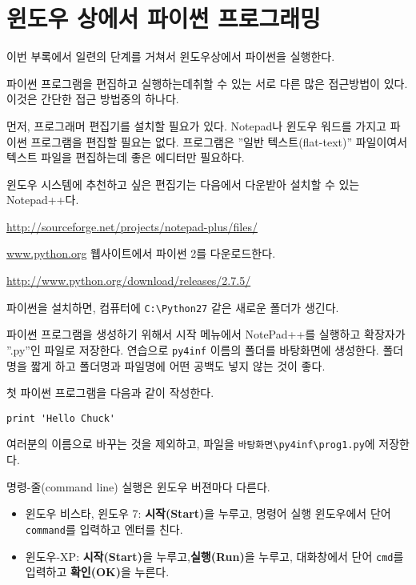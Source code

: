 
\chapter{윈도우 상에서 파이썬 프로그래밍}

이번 부록에서 일련의 단계를 거쳐서 윈도우상에서 파이썬을 실행한다.

파이썬 프로그램을 편집하고 실행하는데취할 수 있는 서로 다른 많은 접근방법이 있다. 이것은 간단한 접근 방법중의 하나다.

먼저, 프로그래머 편집기를 설치할 필요가 있다.
Notepad나 윈도우 워드를 가지고 파이썬 프로그램을 편집할 필요는 없다.
프로그램은 ''일반 텍스트(flat-text)'' 파일이여서 텍스트 파일을 편집하는데 좋은 에디터만 필요하다.

윈도우 시스템에 추천하고 싶은 편집기는 다음에서 다운받아 설치할 수 있는 Notepad++다.

\url{http://sourceforge.net/projects/notepad-plus/files/}

\url{www.python.org} 웹사이트에서 파이썬 2를 다운로드한다.

\url{http://www.python.org/download/releases/2.7.5/}

파이썬을 설치하면, 컴퓨터에 {\tt C:{\textbackslash}Python27} 같은 새로운 폴더가 생긴다.

파이썬 프로그램을 생성하기 위해서 시작 메뉴에서 NotePad++를 실행하고 확장자가 ''.py''인 파일로 저장한다.
연습으로 {\tt py4inf} 이름의 폴더를 바탕화면에 생성한다.
폴더명을 짧게 하고 폴더명과 파일명에 어떤 공백도 넣지 않는 것이 좋다.

첫 파이썬 프로그램을 다음과 같이 작성한다.

\beforeverb
\begin{verbatim}
print 'Hello Chuck'
\end{verbatim}
\afterverb
%

여러분의 이름으로 바꾸는 것을 제외하고, 파일을 {\tt 바탕화면{\textbackslash}py4inf{\textbackslash}prog1.py}에 저장한다.

명령-줄(command line) 실행은 윈도우 버젼마다 다른다.

\begin{itemize}
\item 윈도우 비스타, 윈도우 7: {\bf 시작(Start)}을 누루고, 명령어 실행 윈도우에서 단어 {\tt command}를 입력하고 엔터를 친다.

\item 윈도우-XP: {\bf 시작(Start)}을 누루고,{\bf 실행(Run)}을 누루고, 대화창에서 단어 {\tt cmd}를 입력하고 {\bf 확인(OK)}을 누른다.
\end{itemize}

